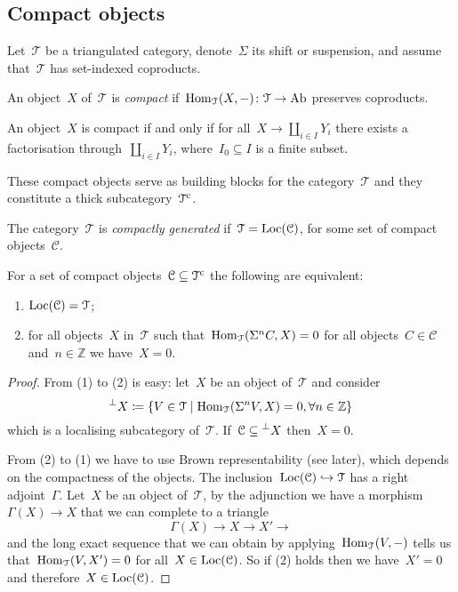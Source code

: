 \documentclass[10pt,a4paper]{article}
\begin{document}
\subsection{Compact objects}
Let~$\mathcal{T}$ be a triangulated category, denote~$\Sigma$ its shift or suspension, and assume that~$\mathcal{T}$ has set-indexed coproducts.
\begin{definition}
  An object~$X$ of~$\mathcal{T}$ is \emph{compact} if~$\operatorname{Hom}_{\mathcal{T}}(X,-)\colon\mathcal{T}\to\mathrm{Ab}$ preserves coproducts.
\end{definition}
\begin{lemma}
  An object~$X$ is compact if and only if for all~$X\to\coprod_{i\in I}Y_i$ there exists a factorisation through~$\coprod_{i\in I}Y_i$, where~$I_0\subseteq I$ is a finite subset.
\end{lemma}
\begin{remark}
  These compact objects serve as building blocks for the category~$\mathcal{T}$ and they constitute a thick subcategory~$\mathcal{T}^{\mathrm{c}}$.
\end{remark}
\begin{definition}
  The category~$\mathcal{T}$ is \emph{compactly generated} if~$\mathcal{T}=\operatorname{Loc}(\mathcal{C})$, for some set of compact objects~$\mathcal{C}$.
\end{definition}
\begin{proposition}
  For a set of compact objects~$\mathcal{C}\subseteq\mathcal{T}^{\mathrm{c}}$ the following are equivalent:
  \begin{enumerate}
    \item $\operatorname{Loc}(\mathcal{C})=\mathcal{T}$;
    \item for all objects~$X$ in~$\mathcal{T}$ such that~$\operatorname{Hom}_{\mathcal{T}}(\Sigma^nC,X)=0$ for all objects~$C\in\mathcal{C}$ and~$n\in\mathbb{Z}$ we have~$X=0$.
  \end{enumerate}

  \begin{proof}
    From (1) to (2) is easy: let~$X$ be an object of~$\mathcal{T}$ and consider
    \begin{equation}
      \prescript{\perp}{}{X}\coloneqq\left\{ V\in\mathcal{T}\mid\operatorname{Hom}_{\mathcal{T}}(\Sigma^nV,X)=0,\forall n\in\mathbb{Z} \right\}
    \end{equation}
    which is a localising subcategory of~$\mathcal{T}$. If~$\mathcal{C}\subseteq\prescript{\perp}{}{X}$ then~$X=0$.

    From (2) to (1) we have to use Brown representability (see later), which depends on the compactness of the objects. The inclusion~$\operatorname{Loc}(\mathcal{C})\hookrightarrow\mathcal{T}$ has a right adjoint~$\Gamma$. Let~$X$ be an object of~$\mathcal{T}$, by the adjunction we have a morphism~$\Gamma(X)\to X$ that we can complete to a triangle
    \begin{equation}
      \Gamma(X)\to X\to X'\to
    \end{equation}
    and the long exact sequence that we can obtain by applying~$\operatorname{Hom}_{\mathcal{T}}(V,-)$ tells us that~$\operatorname{Hom}_{\mathcal{T}}(V,X')=0$ for all~$X\in\operatorname{Loc}(\mathcal{C})$. So if (2) holds then we have~$X'=0$ and therefore~$X\in\operatorname{Loc}(\mathcal{C})$.%
  \end{proof}
\end{proposition}
\end{document}
